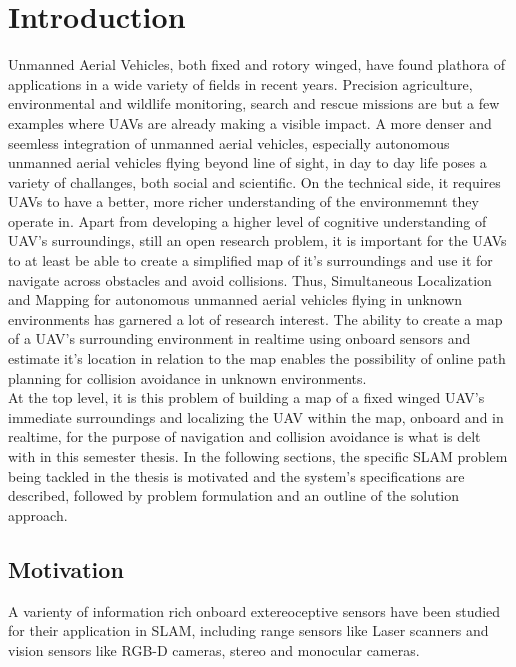 \chapter{Introduction}
\label{sec:introduction}
Unmanned Aerial Vehicles, both fixed and rotory winged, have found plathora of applications in a wide variety of fields in recent years. Precision agriculture, environmental and  wildlife monitoring, search and rescue missions are but a few examples where UAVs are already making a visible impact. A more denser and seemless integration of unmanned aerial vehicles, especially autonomous unmanned aerial vehicles flying beyond line of sight, in day to day life poses a variety of challanges, both social and scientific. On the technical side, it requires UAVs to have a better, more richer understanding of the environmemnt they operate in. Apart from developing a higher level of cognitive understanding of UAV's surroundings, still an open research problem, it is important for the UAVs to at least be able to create a simplified map of it's surroundings and use it for navigate across obstacles and avoid collisions. Thus, Simultaneous Localization and Mapping for autonomous unmanned aerial vehicles flying in unknown environments has garnered a lot of research interest. The ability to create a map of a UAV's surrounding environment in realtime using onboard sensors and estimate it's location in relation to the map enables the possibility of online path planning for collision avoidance in unknown environments.\\
At the top level, it is this problem of building a map of a fixed winged UAV's immediate surroundings and localizing the UAV within the map, onboard and in realtime, for the purpose of navigation and collision avoidance is what is delt with in this semester thesis. In the following sections, the specific SLAM problem being tackled in the thesis is motivated and the system's specifications are described, followed by problem formulation and an outline of the solution approach.



\section{Motivation}
\label{sec:intro_motivation}

A varienty of information rich onboard extereoceptive sensors have been studied for their application in SLAM, including range sensors like Laser scanners and vision sensors like RGB-D cameras, stereo and monocular cameras. 

